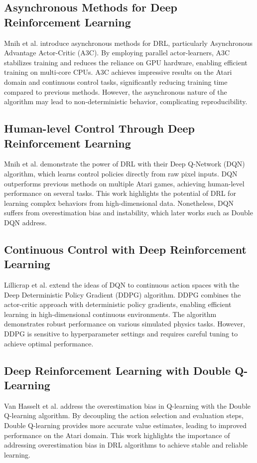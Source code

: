 \documentclass[12pt]{article}
\begin{document}
\subsection{Asynchronous Methods for Deep Reinforcement Learning}
Mnih et al. \cite{mnih2016asynchronous} introduce asynchronous methods for DRL, particularly Asynchronous Advantage Actor-Critic (A3C). By employing parallel actor-learners, A3C stabilizes training and reduces the reliance on GPU hardware, enabling efficient training on multi-core CPUs. A3C achieves impressive results on the Atari domain and continuous control tasks, significantly reducing training time compared to previous methods. However, the asynchronous nature of the algorithm may lead to non-deterministic behavior, complicating reproducibility.

\subsection{Human-level Control Through Deep Reinforcement Learning}
Mnih et al. \cite{mnih2015human} demonstrate the power of DRL with their Deep Q-Network (DQN) algorithm, which learns control policies directly from raw pixel inputs. DQN outperforms previous methods on multiple Atari games, achieving human-level performance on several tasks. This work highlights the potential of DRL for learning complex behaviors from high-dimensional data. Nonetheless, DQN suffers from overestimation bias and instability, which later works such as Double DQN \cite{van2016deep} address.

\subsection{Continuous Control with Deep Reinforcement Learning}
Lillicrap et al. \cite{lillicrap2016continuous} extend the ideas of DQN to continuous action spaces with the Deep Deterministic Policy Gradient (DDPG) algorithm. DDPG combines the actor-critic approach with deterministic policy gradients, enabling efficient learning in high-dimensional continuous environments. The algorithm demonstrates robust performance on various simulated physics tasks. However, DDPG is sensitive to hyperparameter settings and requires careful tuning to achieve optimal performance.

\subsection{Deep Reinforcement Learning with Double Q-Learning}
Van Hasselt et al. \cite{van2016deep} address the overestimation bias in Q-learning with the Double Q-learning algorithm. By decoupling the action selection and evaluation steps, Double Q-learning provides more accurate value estimates, leading to improved performance on the Atari domain. This work highlights the importance of addressing overestimation bias in DRL algorithms to achieve stable and reliable learning.
\end{document}
